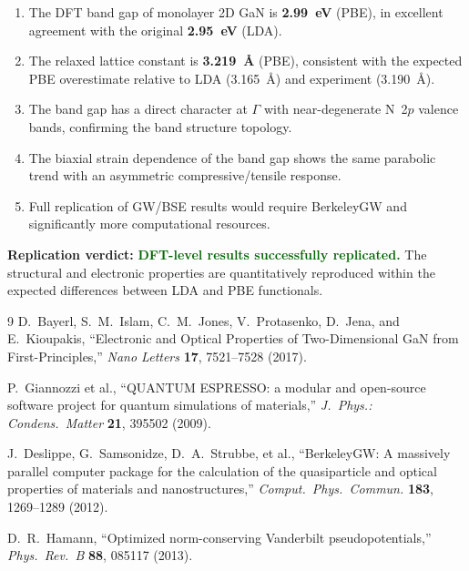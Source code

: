 \documentclass[11pt]{article}
\begin{document}
\begin{enumerate}
    \item The DFT band gap of monolayer 2D GaN is \textbf{2.99~eV} (PBE), in excellent agreement with the original \textbf{2.95~eV} (LDA).
    \item The relaxed lattice constant is \textbf{3.219~\AA} (PBE), consistent with the expected PBE overestimate relative to LDA (3.165~\AA) and experiment (3.190~\AA).
    \item The band gap has a direct character at $\Gamma$ with near-degenerate N~2$p$ valence bands, confirming the band structure topology.
    \item The biaxial strain dependence of the band gap shows the same parabolic trend with an asymmetric compressive/tensile response.
    \item Full replication of GW/BSE results would require BerkeleyGW and significantly more computational resources.
\end{enumerate}

\noindent\textbf{Replication verdict:} \textcolor{darkgreen}{\textbf{DFT-level results successfully replicated.}} The structural and electronic properties are quantitatively reproduced within the expected differences between LDA and PBE functionals.

\begin{thebibliography}{9}
D.~Bayerl, S.~M.~Islam, C.~M.~Jones, V.~Protasenko, D.~Jena, and E.~Kioupakis,
``Electronic and Optical Properties of Two-Dimensional GaN from First-Principles,''
\textit{Nano Letters} \textbf{17}, 7521--7528 (2017).

P.~Giannozzi et al.,
``QUANTUM ESPRESSO: a modular and open-source software project for quantum simulations of materials,''
\textit{J.\ Phys.: Condens.\ Matter} \textbf{21}, 395502 (2009).

J.~Deslippe, G.~Samsonidze, D.~A.~Strubbe, et al.,
``BerkeleyGW: A massively parallel computer package for the calculation of the quasiparticle and optical properties of materials and nanostructures,''
\textit{Comput.\ Phys.\ Commun.} \textbf{183}, 1269--1289 (2012).

D.~R.~Hamann,
``Optimized norm-conserving Vanderbilt pseudopotentials,''
\textit{Phys.\ Rev.\ B} \textbf{88}, 085117 (2013).
\end{thebibliography}
\end{document}
